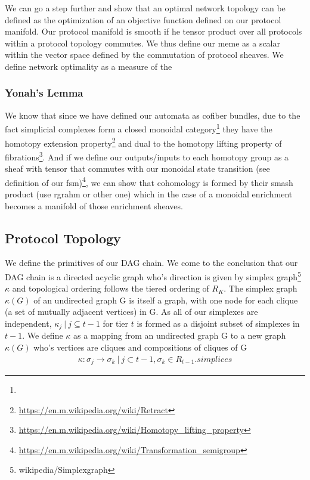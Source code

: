\documentclass{article}
\begin{document}
We can go a step further and show that an optimal network topology can be defined as the optimization of an objective function defined on our protocol manifold. Our protocol manifold is smooth if he tensor product over all protocols within a protocol topology commutes. We thus define our meme as a scalar within the vector space defined by the commutation of protocol sheaves. We define network optimality as a measure of the 

\subsubsection{Yonah's Lemma}
We know that since we have defined our automata as cofiber bundles, due to the fact simplicial complexes form a closed monoidal category\footnote{} they have the homotopy extension property\footnote{\url{https://en.m.wikipedia.org/wiki/Retract}} and dual to the homotopy lifting property of fibrations\footnote{\url{https://en.m.wikipedia.org/wiki/Homotopy_lifting_property}}. And if we define our outputs/inputs to each homotopy group as a sheaf with tensor that commutes with our monoidal state transition (see definition of our fsm)\footnote{\url{https://en.m.wikipedia.org/wiki/Transformation_semigroup}}, we can show that cohomology is formed by their smash product (use rgrahm or other one) which in the case of a monoidal enrichment becomes a manifold of those enrichment sheaves.

\subsection{Protocol Topology}
We define the primitives of our DAG chain. We come to the conclusion that our DAG chain is a directed acyclic graph who's direction is given by simplex graph\footnote{wikipedia/Simplexgraph} $\kappa$ and topological ordering follows the tiered ordering of $R_K$. The simplex graph $\kappa(G)$ of an undirected graph G is itself a graph, with one node for each clique (a set of mutually adjacent vertices) in G. As all of our simplexes are independent, $\kappa_j \ | \ j \subseteq t-1$ for tier $t$ is formed as a disjoint subset of simplexes in $t-1$. We define $\kappa$ as a mapping from an undirected graph G to a new graph $\kappa(G)$ who's vertices are cliques and compositions of cliques of G
\begin{equation} \label{eq1}
\begin{split}
\kappa: \sigma_j \rightarrow \sigma_k \ | \ j \subset t-1, \sigma_k \in R_{t-1}.simplices
\end{split}
\end{equation}
\end{document}

